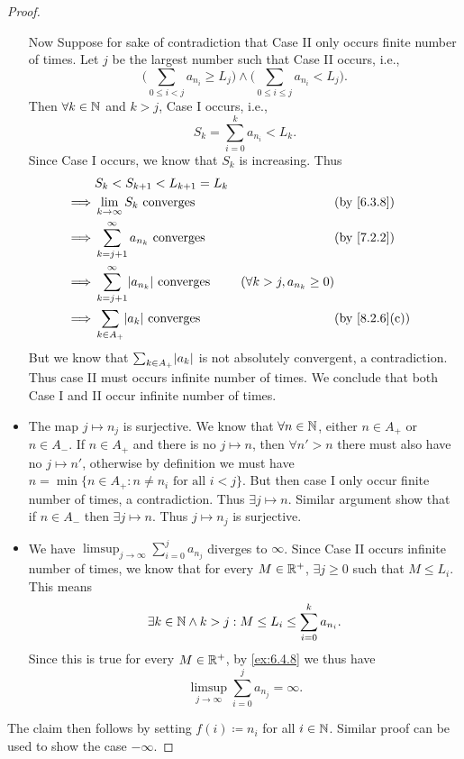 \begin{proof}
\begin{itemize}
          Now Suppose for sake of contradiction that Case II only occurs finite number of times.
          Let \(j\) be the largest number such that Case II occurs, i.e.,
          \[
            \Bigg(\sum_{0 \leq i < j} a_{n_i} \geq L_j\Bigg) \land \Bigg(\sum_{0 \leq i \leq j} a_{n_i} < L_j\Bigg).
          \]
          Then \(\forall k \in \mathbb{N}\) and \(k > j\), Case I occurs, i.e.,
          \[
            S_k = \sum_{i = 0}^k a_{n_i} < L_k.
          \]
          Since Case I occurs, we know that \(S_k\) is increasing.
          Thus
          \begin{align*}
                     & S_k < S_{k + 1} < L_{k + 1} = L_k                                                                                       \\
            \implies & \lim_{k \to \infty} S_k \text{ converges}               &                                 & \by{6.3.8}                  \\
            \implies & \sum_{k = j + 1}^\infty a_{n_k} \text{ converges}       &                                 & \by{7.2.2}                  \\
            \implies & \sum_{k = j + 1}^\infty \abs{a_{n_k}} \text{ converges} & (\forall k > j, a_{n_k} \geq 0)                               \\
            \implies & \sum_{k \in A_+} \abs{a_k} \text{ converges}            &                                 & \text{(by \cref{8.2.6}(c))}
          \end{align*}
          But we know that \(\sum_{k \in A_+} \abs{a_k}\) is not absolutely convergent, a contradiction.
          Thus case II must occurs infinite number of times.
          We conclude that both Case I and II occur infinite number of times.
    \item The map \(j \mapsto n_j\) is surjective.
          We know that \(\forall n \in \mathbb{N}\), either \(n \in A_+\) or \(n \in A_-\).
          If \(n \in A_+\) and there is no \(j \mapsto n\), then \(\forall n' > n\) there must also have no \(j \mapsto n'\), otherwise by definition we must have \(n = \min\{n \in A_+ : n \neq n_i \text{ for all } i < j\}\).
          But then case I only occur finite number of times, a contradiction.
          Thus \(\exists j \mapsto n\).
          Similar argument show that if \(n \in A_-\) then \(\exists j \mapsto n\).
          Thus \(j \mapsto n_j\) is surjective.
    \item We have \(\limsup_{j \to \infty} \sum_{i = 0}^j a_{n_j}\) diverges to \(\infty\).
          Since Case II occurs infinite number of times, we know that for every \(M \in \mathbb{R}^+\), \(\exists j \geq 0\) such that \(M \leq L_i\).
          This means
          \[
            \exists k \in \mathbb{N} \land k > j : M \leq L_i \leq \sum_{i = 0}^k a_{n_i}.
          \]
          Since this is true for every \(M \in \mathbb{R}^+\), by \cref{ex:6.4.8} we thus have
          \[
            \limsup_{j \to \infty} \sum_{i = 0}^j a_{n_j} = \infty.
          \]
  \end{itemize}
  The claim then follows by setting \(f(i) \coloneqq n_i\) for all \(i \in \mathbb{N}\).
  Similar proof can be used to show the case \(-\infty\).
\end{proof}